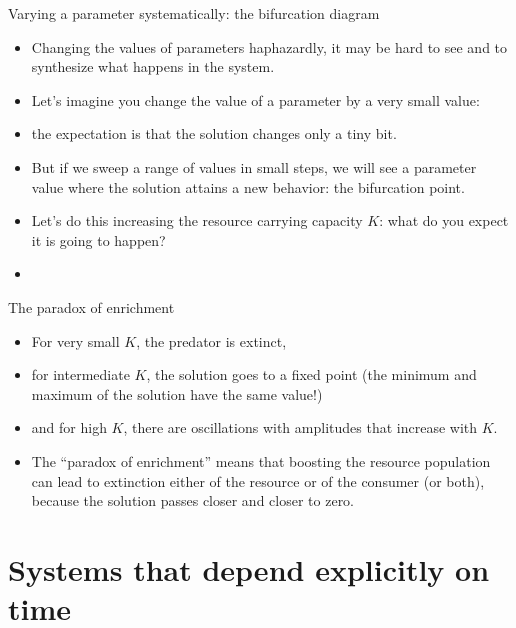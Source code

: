 \documentclass{beamer}
\begin{document}
\begin{frame}{Varying a parameter systematically: the bifurcation diagram}
    \begin{itemize}
        \item Changing the values of parameters haphazardly, it may be hard to
            see and to synthesize what happens in the system.
        \item Let's imagine you change the value of a parameter by a very
            small value:
        \pause
        \item the expectation is that the solution changes only a tiny bit.
        \item But if we sweep a range of values in small steps, we will see a
            parameter value where the solution attains a new behavior: the bifurcation
            point.
        \item Let's do this increasing the resource carrying capacity $K$:
            what do you expect it is going to happen?
        \item
    \end{itemize}
\end{frame}

\begin{frame}{The paradox of enrichment}
    \begin{itemize}
        \item For very small $K$, the predator is extinct,
        \item for intermediate $K$, the solution goes to a fixed point (the
            minimum and maximum of the solution have the same value!)
        \item and for high $K$, there are oscillations with amplitudes that
            increase with $K$.
            \pause
        \item The ``paradox of enrichment'' means that boosting
            the resource population can lead to extinction either of the
            resource or of the consumer (or both), because the solution passes
            closer and closer to zero.
    \end{itemize}
\end{frame}

\section{Systems that depend explicitly on time}
\end{document}
